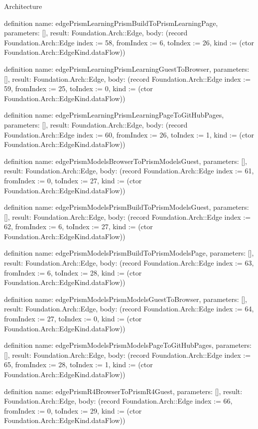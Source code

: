 \begin{lexlean}{Architecture}
\begin{semanticmodule}
definition{
  name: edgePrismLearningPrismBuildToPrismLearningPage,
  parameters: [],
  result: Foundation.Arch::Edge,
  body: (record Foundation.Arch::Edge {index := 58, fromIndex := 6, toIndex := 26, kind := (ctor Foundation.Arch::EdgeKind.dataFlow)})
}

definition{
  name: edgePrismLearningPrismLearningGuestToBrowser,
  parameters: [],
  result: Foundation.Arch::Edge,
  body: (record Foundation.Arch::Edge {index := 59, fromIndex := 25, toIndex := 0, kind := (ctor Foundation.Arch::EdgeKind.dataFlow)})
}

definition{
  name: edgePrismLearningPrismLearningPageToGitHubPages,
  parameters: [],
  result: Foundation.Arch::Edge,
  body: (record Foundation.Arch::Edge {index := 60, fromIndex := 26, toIndex := 1, kind := (ctor Foundation.Arch::EdgeKind.dataFlow)})
}

definition{
  name: edgePrismModelsBrowserToPrismModelsGuest,
  parameters: [],
  result: Foundation.Arch::Edge,
  body: (record Foundation.Arch::Edge {index := 61, fromIndex := 0, toIndex := 27, kind := (ctor Foundation.Arch::EdgeKind.dataFlow)})
}

definition{
  name: edgePrismModelsPrismBuildToPrismModelsGuest,
  parameters: [],
  result: Foundation.Arch::Edge,
  body: (record Foundation.Arch::Edge {index := 62, fromIndex := 6, toIndex := 27, kind := (ctor Foundation.Arch::EdgeKind.dataFlow)})
}

definition{
  name: edgePrismModelsPrismBuildToPrismModelsPage,
  parameters: [],
  result: Foundation.Arch::Edge,
  body: (record Foundation.Arch::Edge {index := 63, fromIndex := 6, toIndex := 28, kind := (ctor Foundation.Arch::EdgeKind.dataFlow)})
}

definition{
  name: edgePrismModelsPrismModelsGuestToBrowser,
  parameters: [],
  result: Foundation.Arch::Edge,
  body: (record Foundation.Arch::Edge {index := 64, fromIndex := 27, toIndex := 0, kind := (ctor Foundation.Arch::EdgeKind.dataFlow)})
}

definition{
  name: edgePrismModelsPrismModelsPageToGitHubPages,
  parameters: [],
  result: Foundation.Arch::Edge,
  body: (record Foundation.Arch::Edge {index := 65, fromIndex := 28, toIndex := 1, kind := (ctor Foundation.Arch::EdgeKind.dataFlow)})
}

definition{
  name: edgePrismR4BrowserToPrismR4Guest,
  parameters: [],
  result: Foundation.Arch::Edge,
  body: (record Foundation.Arch::Edge {index := 66, fromIndex := 0, toIndex := 29, kind := (ctor Foundation.Arch::EdgeKind.dataFlow)})
}


\end{semanticmodule}
\end{lexlean}
